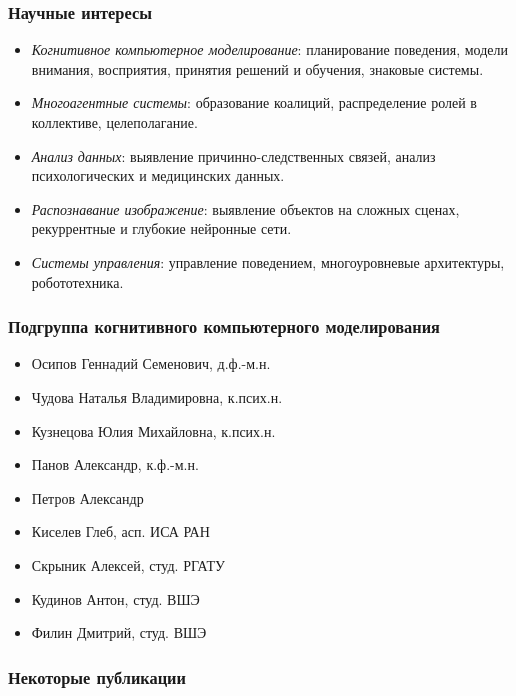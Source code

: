 \documentclass[default]{beamer}
\renewcommand*{\bibfont}{\footnotesize}
\begin{document}
	\begin{frame}
		\frametitle{Научные интересы}
		
		\begin{itemize}
			\item \textit{Когнитивное компьютерное моделирование}: планирование поведения, модели внимания, восприятия, принятия решений и обучения, знаковые системы.
			\item \textit{Многоагентные системы}: образование коалиций, распределение ролей в коллективе, целеполагание.
			\item \textit{Анализ данных}: выявление причинно-следственных связей, анализ психологических и медицинских данных.
			\item \textit{Распознавание изображение}: выявление объектов на сложных сценах, рекуррентные и глубокие нейронные сети.
			\item \textit{Системы управления}: управление поведением, многоуровневые архитектуры, робототехника.
		\end{itemize}
	\end{frame}

	\begin{frame}
		\frametitle{Подгруппа когнитивного компьютерного моделирования}
		
		\begin{itemize}
			\item Осипов Геннадий Семенович, д.ф.-м.н.
			\item Чудова Наталья Владимировна, к.псих.н.
			\item Кузнецова Юлия Михайловна, к.псих.н.
			\item Панов Александр, к.ф.-м.н.
			\item Петров Александр
			\item Киселев Глеб, асп. ИСА РАН
			\item Скрыник Алексей, студ. РГАТУ
			\item Кудинов Антон, студ. ВШЭ
			\item Филин Дмитрий, студ. ВШЭ
		\end{itemize}
	\end{frame}		
		
	\begin{frame}
		\frametitle{Некоторые публикации}
		\renewcommand*{\bibfont}{\tiny}
		\nocite{*}
		\printbibliography
	\end{frame}
	
\end{document}
